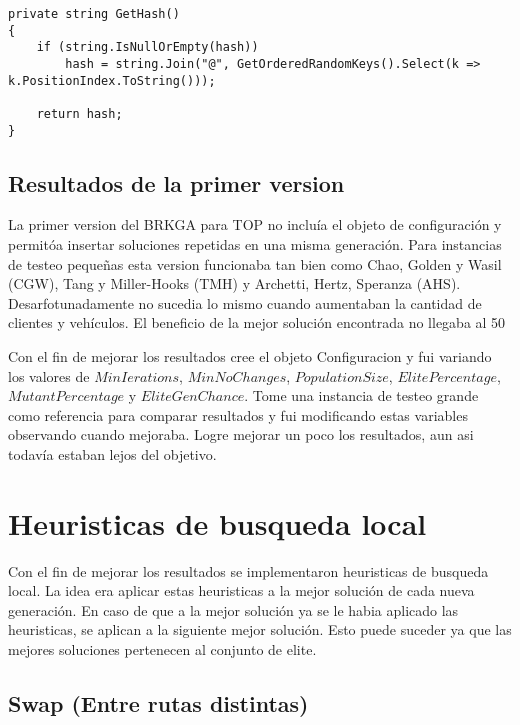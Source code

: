 \begin{lstlisting}
private string GetHash()
{
    if (string.IsNullOrEmpty(hash))
        hash = string.Join("@", GetOrderedRandomKeys().Select(k => k.PositionIndex.ToString()));

    return hash;
}
\end{lstlisting}

\subsection{Resultados de la primer version}

La primer version del BRKGA para TOP no incluía el objeto de configuración y permitóa insertar soluciones repetidas en una misma generación. Para instancias de testeo pequeñas esta version funcionaba tan bien como Chao, Golden y Wasil (CGW), Tang y Miller-Hooks (TMH) y Archetti, Hertz, Speranza (AHS). Desarfotunadamente no sucedia lo mismo cuando aumentaban la cantidad de clientes y vehículos. El beneficio de la mejor solución encontrada no llegaba al 50%

\bigskip

Con el fin de mejorar los resultados cree el objeto Configuracion y fui variando los valores de $MinIerations$, $MinNoChanges$, $PopulationSize$, $ElitePercentage$, $MutantPercentage$ y $EliteGenChance$. Tome una instancia de testeo grande como referencia para comparar resultados y fui modificando estas variables observando cuando mejoraba. Logre mejorar un poco los resultados, aun asi todavía estaban lejos del objetivo.

\section{Heuristicas de busqueda local}

Con el fin de mejorar los resultados se implementaron heuristicas de busqueda local. La idea era aplicar estas heuristicas a la mejor solución de cada nueva generación. En caso de que a la mejor solución ya se le habia aplicado las heuristicas, se aplican a la siguiente mejor solución. Esto puede suceder ya que las mejores soluciones pertenecen al conjunto de elite.

\subsection{Swap (Entre rutas distintas)}

